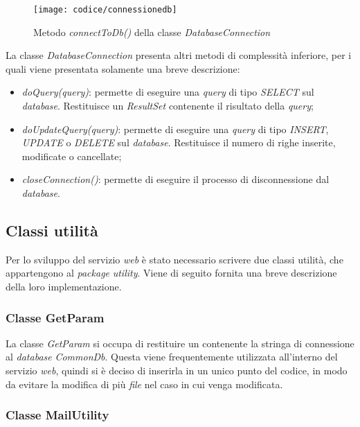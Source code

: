 \begin{figure}[!h] 
    \centering 
    \texttt{[image: codice/connessionedb]} 
    \caption{Metodo \textit{connectToDb()} della classe \textit{DatabaseConnection}}
\end{figure}
\newpage
{}

La classe \textit{DatabaseConnection} presenta altri metodi di complessità inferiore, per i quali viene presentata solamente una breve descrizione:
\begin{itemize}
	\item \textit{doQuery(query)}: permette di eseguire una \textit{query} di tipo \textit{SELECT} sul \textit{database}. Restituisce un \textit{ResultSet} contenente il risultato della \textit{query};
	\item \textit{doUpdateQuery(query)}: permette di eseguire una \textit{query} di tipo \textit{INSERT}, \textit{UPDATE} o \textit{DELETE} sul \textit{database}. Restituisce il numero di righe inserite, modificate o cancellate;
	\item \textit{closeConnection()}: permette di eseguire il processo di disconnessione dal \textit{database}.
\end{itemize}

\subsection{Classi utilità}

Per lo sviluppo del servizio \textit{web} è stato necessario scrivere due classi utilità, che appartengono al \textit{package} \textit{utility}. Viene di seguito fornita una breve descrizione della loro implementazione.

\subsubsection{Classe GetParam}

La classe \textit{GetParam} si occupa di restituire un  contenente la stringa di connessione al \textit{database} \textit{CommonDb}. Questa viene frequentemente utilizzata all'interno del servizio \textit{web}, quindi si è deciso di inserirla in un unico punto del codice, in modo da evitare la modifica di più \textit{file} nel caso in cui venga modificata.

\subsubsection{Classe MailUtility}

